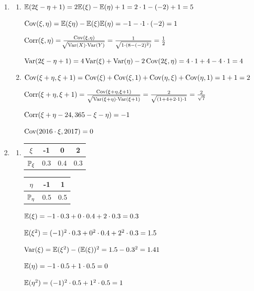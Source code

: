 \documentclass[12pt, a4paper]{article}\usepackage[]{graphicx}\usepackage[]{color}
\begin{document}
						\begin{enumerate}
							\item \begin{enumerate}
								\item $\E (2\xi - \eta +1) = 2 \E (\xi) - \E (\eta) + 1 = 2\cdot 1 - (-2) + 1 = 5 $

								$\Cov (\xi, \eta) = \E (\xi \eta) - \E(\xi) \E(\eta) = -1 - \cdot 1 \cdot (-2) = 1$

								$\Corr (\xi, \eta) = \frac{\Cov(\xi, \eta)}{\sqrt[]{\Var(X) \cdot \Var(Y)}} = \frac{1}{\sqrt{1 \cdot (8-(-2)^2)}} = \frac{1}{2}$

								$\Var (2\xi - \eta + 1) = 4\Var(\xi) + \Var(\eta) - 2 \Cov (2\xi, \eta) = 4 \cdot 1 + 4 - 4 \cdot 1 = 4$

								\item $\Cov(\xi + \eta, \xi + 1) = \Cov(\xi) + \Cov(\xi, 1) + \Cov(\eta, \xi) + \Cov(\eta, 1) = 1 +1 = 2$

								$\Corr(\xi + \eta , \xi + 1) = \frac{\Cov(\xi + \eta , \xi + 1)}{\sqrt{\Var(\xi + \eta)\cdot \Var (\xi + 1)}} = \frac{2}{\sqrt{(1+4+2\cdot 1) \cdot 1}} = \frac{2}{\sqrt{7}}$

								$\Corr(\xi + \eta - 24, 365 - \xi - \eta) = -1$

								$\Cov(2016\cdot \xi, 2017) = 0$

							\end{enumerate}
							\item \begin{enumerate}
								\item \begin{tabular}{c|ccc|}
									$\xi$ & -1 & 0 & 2 \\ \hline
									$\P_{\xi}$ & 0.3 & 0.4 & 0.3
								\end{tabular}
								\begin{tabular}{|c|cc}
									$\eta$ & -1 & 1 \\ \hline
									$\P_{\eta}$ & 0.5 & 0.5
								\end{tabular}

								$\E(\xi) = -1 \cdot 0.3 + 0 \cdot 0.4 + 2 \cdot 0.3 = 0.3$

								$\E (\xi^2) = (-1)^2 \cdot 0.3 + 0^2 \cdot 0.4 + 2^2 \cdot 0.3 = 1.5$

								$\Var(\xi) = \E(\xi^2) - (\E(\xi))^2 = 1.5 - 0.3^2 = 1.41$

								$\E(\eta) = -1 \cdot 0.5 + 1 \cdot 0.5 = 0$

								$\E(\eta^2) = (-1)^2 \cdot 0.5 + 1^2 \cdot 0.5 = 1$


\end{enumerate}
\end{enumerate}
\end{document}
